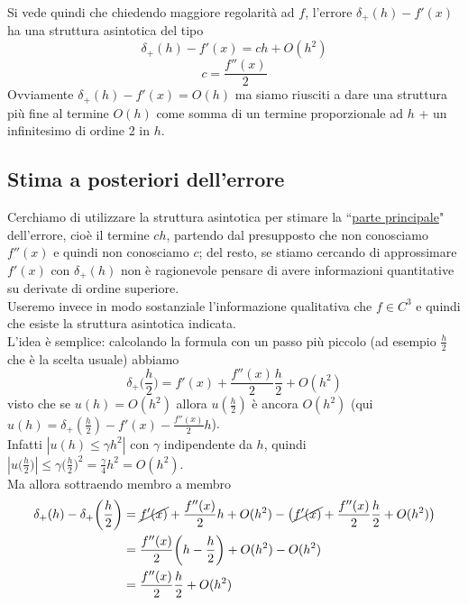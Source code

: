 \documentclass[12pt,a4paper]{article}
\begin{document}
Si vede quindi che chiedendo maggiore regolarità ad $f$, l'errore $\delta_+(h)-f'(x)$ ha una struttura asintotica del tipo
\begin{equation*}
    \delta_+(h)-f'(x)=ch+O(h^2)
\end{equation*}
\begin{equation*}
    c=\frac{f''(x)}{2}
\end{equation*}
Ovviamente $\delta_+(h)-f'(x)=O(h)$ ma siamo riusciti a dare una struttura più fine al termine $O(h)$ come somma di un termine proporzionale ad $h$ + un infinitesimo di ordine 2 in $h$.\\

\subsection{Stima a posteriori dell'errore}
Cerchiamo di utilizzare la struttura asintotica per stimare la ``\uline{parte principale}" dell'errore, cioè il termine $ch$, partendo dal presupposto che non conosciamo $f''(x)$ e quindi non conosciamo $c$; del resto, se stiamo cercando di approssimare $f'(x)$ con $\delta_+(h)$ non è ragionevole pensare di avere informazioni quantitative su derivate di ordine superiore.\\Useremo invece in modo
sostanziale l'informazione qualitativa che $f\in C^3$ e quindi che esiste la struttura asintotica indicata.\\L'idea è semplice: calcolando la formula con un passo più piccolo (ad esempio $\frac{h}{2}$ che è la scelta usuale) abbiamo 
\begin{equation*}
    \delta_+\biggl(\frac{h}{2}\biggr)=f'(x)+\frac{f''(x)}{2}\frac{h}{2}+O(h^2)
\end{equation*}
visto che se $u(h)=O(h^2)$ allora $u(\frac{h}{2})$ è ancora $O(h^2)$ (qui $u(h)=\delta_+(\frac{h}{2})-f'(x)-\frac{f''(x)}{2}h$).\\
Infatti $|u(h) \leq \gamma h^2|$ con $\gamma$ indipendente da $h$, quindi $|u\bigl(\frac{h}{2}\bigr)| \leq \gamma \bigl(\frac{h}{2}\bigr)^2 = \frac{\gamma}{4}h^2=O(h^2)$.\\
Ma allora sottraendo membro a membro
\begin{equation*}
    \begin{split}
        \delta_+(h)-\delta_+ \biggl(\frac{h}{2}\biggr) & = \cancel{f'(x)}+\frac{f''(x)}{2}h + O(h^2) - \bigl( \cancel{f'(x)} + \frac{f''(x)}{2}\frac{h}{2} + O(h^2) \bigr) \\
        & = \frac{f''(x)}{2}\biggl(h-\frac{h}{2}\biggr) + O(h^2) - O(h^2) \\
        & = \frac{f''(x)}{2}\frac{h}{2}+O(h^2)
    \end{split}
\end{equation*}
\end{document}
